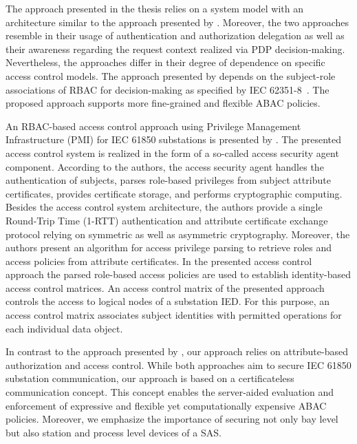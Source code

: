 The approach presented in the thesis relies on a system model with an architecture similar to the approach presented by \citeauthor{Alcaraz2016}.
Moreover, the two approaches resemble in their usage of authentication and authorization delegation as well as their awareness regarding the request context realized via PDP decision-making.
Nevertheless, the approaches differ in their degree of dependence on specific access control models.
The approach presented by \citeauthor{Alcaraz2016} depends on the subject-role associations of RBAC for decision-making as specified by IEC 62351-8~\cite{IEC62351P8}.
The proposed approach supports more fine-grained and flexible ABAC policies.

An RBAC-based access control approach using Privilege Management Infrastructure (PMI) for IEC 61850 substations is presented by \citeauthor{Liu2006} \cite{Liu2006}.
The presented access control system is realized in the form of a so-called access security agent component.
According to the authors, the access security agent handles the authentication of subjects, parses role-based privileges from subject attribute certificates, provides certificate storage, and performs cryptographic computing.
Besides the access control system architecture, the authors provide a single Round-Trip Time (1-RTT) authentication and attribute certificate exchange protocol relying on symmetric as well as asymmetric cryptography.
Moreover, the authors present an algorithm for access privilege parsing to retrieve roles and access policies from attribute certificates.
In the presented access control approach the parsed role-based access policies are used to establish identity-based access control matrices.
An access control matrix of the presented approach controls the access to logical nodes of a substation IED.
For this purpose, an access control matrix associates subject identities with permitted operations for each individual data object.

In contrast to the approach presented by \citeauthor{Liu2006}, our approach relies on attribute-based authorization and access control.
While both approaches aim to secure IEC 61850 substation communication, our approach is based on a certificateless communication concept.
This concept enables the server-aided evaluation and enforcement of expressive and flexible yet computationally expensive ABAC policies.
Moreover, we emphasize the importance of securing not only bay level but also station and process level devices of a SAS.
